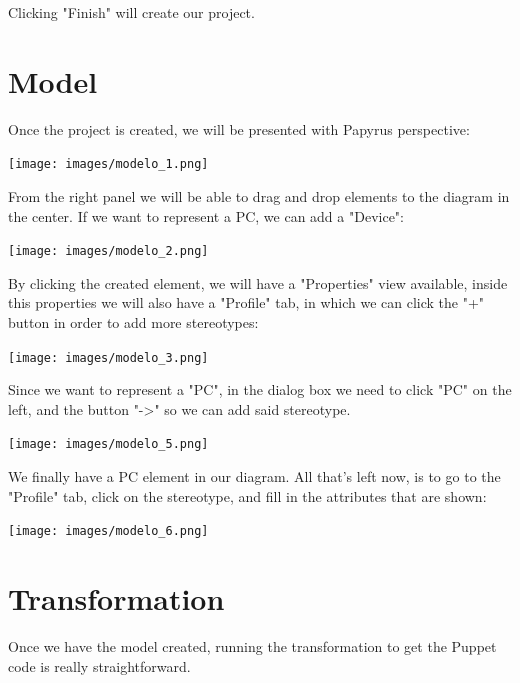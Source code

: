 \documentclass[11pt]{article}
\begin{document}
Clicking "Finish" will create our project.
\newpage

\section{Model}
\label{sec:org056320f}

Once the project is created, we will be presented with Papyrus perspective:

\begin{center}
\texttt{[image: images/modelo\_1.png]}
\end{center}

From the right panel we will be able to drag and drop elements to the diagram in the center. If we want to represent a PC, we can add a "Device":

\begin{center}
\texttt{[image: images/modelo\_2.png]}
\end{center}

By clicking the created element, we will have a "Properties" view available, inside this properties we will also have a "Profile" tab, in which we can click the "+" button in order to add more stereotypes:

\begin{center}
\texttt{[image: images/modelo\_3.png]}
\end{center}
\newpage

Since we want to represent a "PC", in the dialog box we need to click "PC" on the left, and the button "->" so we can add said stereotype.


\begin{center}
\texttt{[image: images/modelo\_5.png]}
\end{center}

We finally have a PC element in our diagram. All that's left now, is to go to the "Profile" tab, click on the stereotype, and fill in the attributes that are shown:

\begin{center}
\texttt{[image: images/modelo\_6.png]}
\end{center}
\newpage

\section{Transformation}
\label{sec:org2b6f134}

Once we have the model created, running the transformation to get the Puppet code is really straightforward.
\end{document}
